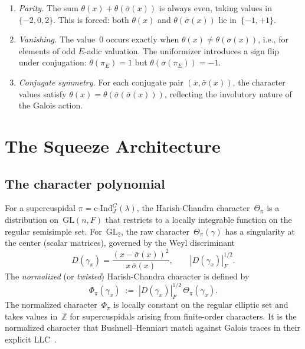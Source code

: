 \documentclass[11pt]{article}
\theoremstyle{plain}
\theoremstyle{definition}
\theoremstyle{remark}
\newcommand{\Z}{\mathbb{Z}}
\newcommand{\GL}{\mathrm{GL}}
\newcommand{\cInd}{\mathrm{c\text{-}Ind}}
\newcommand{\Phipi}{\Phi_\pi}
\begin{document}
\begin{enumerate}[nosep]
\item \emph{Parity.}  The sum $\theta(x) + \theta(\bar\sigma(x))$
  is always even, taking values in $\{-2, 0, 2\}$.  This is
  forced: both $\theta(x)$ and $\theta(\bar\sigma(x))$ lie
  in~$\{-1, +1\}$.
\item \emph{Vanishing.}  The value~$0$ occurs exactly when
  $\theta(x) \neq \theta(\bar\sigma(x))$, i.e., for elements
  of odd $E$-adic valuation.  The uniformizer introduces a sign
  flip under conjugation: $\theta(\pi_E) = 1$ but
  $\theta(\bar\sigma(\pi_E)) = -1$.
\item \emph{Conjugate symmetry.}  For each conjugate pair
  $(x, \bar\sigma(x))$, the character values satisfy
  $\theta(x) = \theta(\bar\sigma(\bar\sigma(x)))$, reflecting
  the involutory nature of the Galois action.
\end{enumerate}

\section{The Squeeze Architecture}\label{sec:arch}

\subsection{The character polynomial}

For a supercuspidal $\pi = \cInd_J^G(\lambda)$, the
Harish-Chandra character~$\Theta_\pi$ is a distribution
on~$\GL(n, F)$ that restricts to a locally integrable function
on the regular semisimple set.  For~$\GL_2$, the raw
character~$\Theta_\pi(\gamma)$ has a singularity at the
center (scalar matrices), governed by the Weyl discriminant
\[
  D(\gamma_x) = \frac{(x - \bar\sigma(x))^2}{x \,\bar\sigma(x)},
  \qquad |D(\gamma_x)|_F^{1/2}.
\]
The \emph{normalized} (or \emph{twisted}) Harish-Chandra
character is defined by
\[
  \Phipi(\gamma_x) \;:=\; |D(\gamma_x)|_F^{1/2}\,\Theta_\pi(\gamma_x).
\]
The normalized character~$\Phipi$ is locally constant on
the regular elliptic set and takes values in~$\Z$ for
supercuspidals arising from finite-order characters.  It is the
normalized character that Bushnell--Henniart match against
Galois traces in their explicit LLC~\cite{BushnellHenniart2006}.
\end{document}
